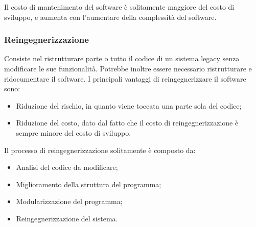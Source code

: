 \documentclass[a4paper, 10pt]{article}
\begin{document}
Il costo di mantenimento del software è solitamente maggiore del costo di sviluppo, e aumenta con l'aumentare della complessità del software. 

\subsubsection{Reingegnerizzazione}
Consiste nel ristrutturare parte o tutto il codice di un sistema legacy senza modificare le sue funzionalità. Potrebbe inoltre essere necessario ristrutturare e ridocumentare il software.
I principali vantaggi di reingegnerizzare il software sono:
\begin{itemize}
	\item Riduzione del rischio, in quanto viene toccata una parte sola del codice;
	\item Riduzione del costo, dato dal fatto che il costo di reingegnerizzazione è sempre minore del costo di sviluppo.
\end{itemize}

Il processo di reingegnerizzazione solitamente è composto da:
\begin{itemize}
	\item Analisi del codice da modificare;
	\item Miglioramento della struttura del programma;
	\item Modularizzazione del programma;
	\item Reingegnerizzazione del sistema.
\end{itemize}
	
	
	
\end{document}
